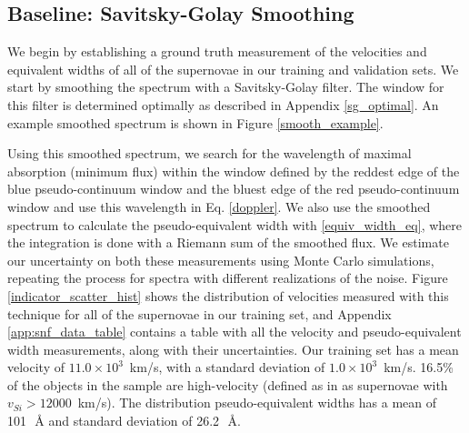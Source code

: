 \subsection{Baseline: Savitsky-Golay Smoothing}
We begin by establishing a ground truth measurement of the velocities and equivalent widths of all of the supernovae in our training and validation sets. We start by smoothing the spectrum with a Savitsky-Golay filter. The window for this filter is determined optimally as described in Appendix \ref{sg_optimal}. An example smoothed spectrum is shown in Figure \ref{smooth_example}.

Using this smoothed spectrum, we search for the wavelength of maximal absorption (minimum flux) within the window defined by the reddest edge of the blue pseudo-continuum window and the bluest edge of the red pseudo-continuum window and use this wavelength in Eq. \ref{doppler}. We also use the smoothed spectrum to calculate the pseudo-equivalent width with \ref{equiv_width_eq}, where the integration is done with a Riemann sum of the smoothed flux. We estimate our uncertainty on both these measurements using Monte Carlo simulations, repeating the process for spectra with different realizations of the noise. Figure \ref{indicator_scatter_hist} shows the distribution of velocities measured with this technique for all of the supernovae in our training set, and Appendix \ref{app:snf_data_table} contains a table with all the velocity and pseudo-equivalent width measurements, along with their uncertainties. Our training set has a mean velocity of $11.0 \times 10^3$~km/s, with a standard deviation of $1.0 \times 10^3$~km/s. 16.5\% of the objects in the sample are high-velocity (defined as in \cite{wang_evidence_2013} as supernovae with $v_{Si}>12000$~km/s). The distribution pseudo-equivalent widths has a mean of 101~\,\AA{} and standard deviation of 26.2~\,\AA{}.

